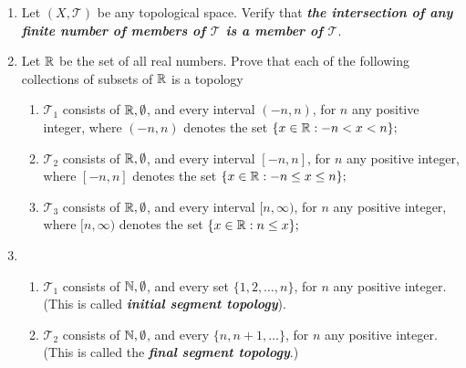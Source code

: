 \documentclass[10pt,a4paper]{report}
\newcommand{\TT}{\mathcal{T}}
\begin{document}
\begin{enumerate}
\noindent
{}

\item Let $(X, \TT)$ be any topological space.  Verify that \textbf{\textit{the intersection of any finite number of members of $\TT$ is a member of $\TT$}}.

\item Let $\mathbb{R}$ be the set of all real numbers.  Prove that each of the following collections of subsets of $\mathbb{R}$ is a topology
\begin{enumerate}[label=(\roman*)]
	\item $\TT_1$ consists of $\mathbb{R}, \emptyset$, and every interval $(-n,n)$, for $n$ any positive integer, where $(-n,n)$ denotes the set $\{x \in\mathbb{R}:-n<x<n\};$
	\item $\TT_2$ consists of $\mathbb{R}, \emptyset$, and every interval $[-n,n]$, for $n$ any positive integer, where $[-n,n]$ denotes the set $\{x \in\mathbb{R}:-n\le x\le n\};$
	\item $\TT_3$ consists of $\mathbb{R}, \emptyset$, and every interval $[n,\infty)$, for $n$ any positive integer, where $[n,\infty)$ denotes the set $\{x \in\mathbb{R}:n\le x\};$
\end{enumerate}

\item 
\begin{enumerate}[label=(\roman*)]
	\item $\TT_1$ consists of $\mathbb{N}, \emptyset$, and every set $\{1,2,\dots,n\}$, for $n$ any positive integer. (This is called \textbf{\textit{initial segment topology}}).
	\item $\TT_2$ consists of $\mathbb{N},\emptyset$, and every $\{n, n+1, \dots\}$, for $n$ any positive integer. (This is called the \textbf{\textit{final segment topology}}.)
\end{enumerate}


\end{enumerate}
\end{document}
